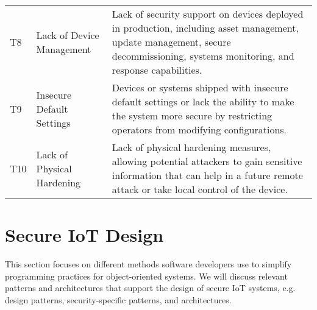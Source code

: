\begin{longtable}[c]{lp{4.5cm}p{7.5cm}}
	T8 & Lack of Device Management & Lack of security support on devices deployed in production, including asset management, update management, secure decommissioning, systems monitoring, and response capabilities.\\
	T9 & Insecure Default Settings & Devices or systems shipped with insecure default settings or lack the ability to make the system more secure by restricting operators from modifying configurations.\\
	T10 & Lack of Physical Hardening & Lack of physical hardening measures, allowing potential attackers to gain sensitive information that can help in a future remote attack or take local control of the device.\\
	\hline
\end{longtable}


\section{Secure IoT Design}\label{sec:design}
This section focuses on different methods software developers use to simplify programming practices for object-oriented systems. We will discuss relevant patterns and architectures that support the design of secure IoT systems, e.g. design patterns, security-specific patterns, and architectures.

